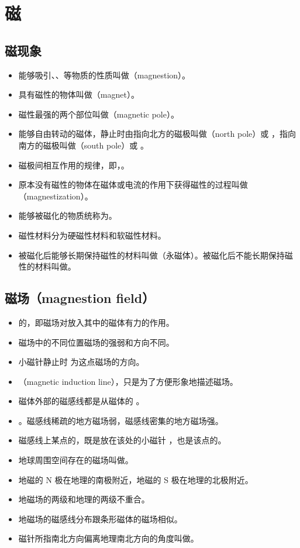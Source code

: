 \section{磁}

\subsection{磁现象}
\begin{itemize}
\item 能够吸引、、等物质的性质叫做（magnestion）。
\item 具有磁性的物体叫做（magnet）。
\item 磁性最强的两个部位叫做（magnetic pole）。
\item 能够自由转动的磁体，静止时由指向北方的磁极叫做（north pole）或 ，指向南方的磁极叫做（south pole）或 。
\item 磁极间相互作用的规律，即，。
\item 原本没有磁性的物体在磁体或电流的作用下获得磁性的过程叫做（magnestization）。
\item 能够被磁化的物质统称为。
\item 磁性材料分为硬磁性材料和软磁性材料。
\item 被磁化后能够长期保持磁性的材料叫做（永磁体）。被磁化后不能长期保持磁性的材料叫做。
\end{itemize}

\subsection{磁场（magnestion field）}
\begin{itemize}
\item {}的，即磁场对放入其中的磁体有力的作用。
\item 磁场中的不同位置磁场的强弱和方向不同。
\item {}小磁针静止时 为这点磁场的方向。
\item {}（magnetic induction line），只是为了方便形象地描述磁场。
\item 磁体外部的磁感线都是从磁体的 。
\item {}。磁感线稀疏的地方磁场弱，磁感线密集的地方磁场强。
\item 磁感线上某点的，既是放在该处的小磁针 ，也是该点的。
\item 地球周围空间存在的磁场叫做。
\item 地磁的 N 极在地理的南极附近，地磁的 S 极在地理的北极附近。
\item 地磁场的两级和地理的两级不重合。
\item 地磁场的磁感线分布跟条形磁体的磁场相似。
\item 磁针所指南北方向偏离地理南北方向的角度叫做。
\end{itemize}

